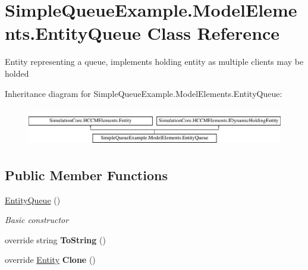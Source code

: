 \hypertarget{class_simple_queue_example_1_1_model_elements_1_1_entity_queue}{}\section{Simple\+Queue\+Example.\+Model\+Elements.\+Entity\+Queue Class Reference}
\label{class_simple_queue_example_1_1_model_elements_1_1_entity_queue}


Entity representing a queue, implements holding entity as multiple clients may be holded  


Inheritance diagram for Simple\+Queue\+Example.\+Model\+Elements.\+Entity\+Queue\+:\begin{figure}[H]
\begin{center}
\leavevmode
\includegraphics[height=1.712538cm]{class_simple_queue_example_1_1_model_elements_1_1_entity_queue}
\end{center}
\end{figure}
\subsection*{Public Member Functions}
\begin{DoxyCompactItemize}
\item 
\hyperlink{class_simple_queue_example_1_1_model_elements_1_1_entity_queue_ab60959c3db5cc996985119e59d3a77fc}{Entity\+Queue} ()
\begin{DoxyCompactList}\small\item\em Basic constructor \end{DoxyCompactList}\item 
override string {\bfseries To\+String} ()\hypertarget{class_simple_queue_example_1_1_model_elements_1_1_entity_queue_a3a3de1c6fe1a0cffcd50b1a77f9d477c}{}\label{class_simple_queue_example_1_1_model_elements_1_1_entity_queue_a3a3de1c6fe1a0cffcd50b1a77f9d477c}

\item 
override \hyperlink{class_simulation_core_1_1_h_c_c_m_elements_1_1_entity}{Entity} {\bfseries Clone} ()\hypertarget{class_simple_queue_example_1_1_model_elements_1_1_entity_queue_a0f4d53560049a9b46dcffb759e2be07a}{}\label{class_simple_queue_example_1_1_model_elements_1_1_entity_queue_a0f4d53560049a9b46dcffb759e2be07a}

\end{DoxyCompactItemize}
